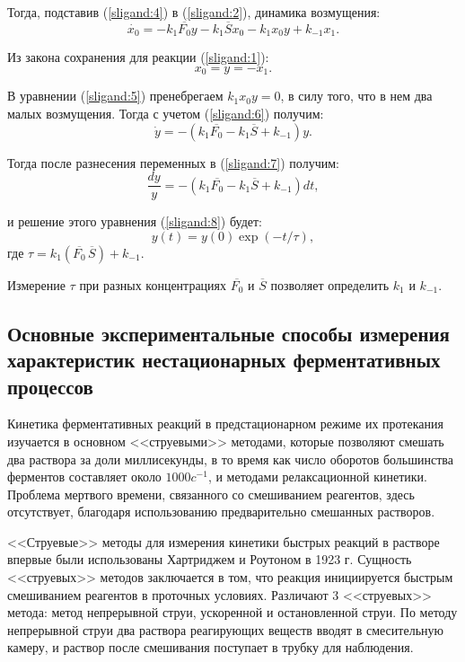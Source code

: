 \documentclass[12pt,a4paper,oneside]{book}
\begin{document}
Тогда, подставив (\ref{sligand:4}) в (\ref{sligand:2}), динамика возмущения:
\begin{equation}
	\label{sligand:5}
	\dot{x_0} = - k_1 \overline{F_0} y - k_1 \overline{S} x_0 - k_1 x_0 y + k_{-1} x_1.
\end{equation}

Из закона сохранения для реакции (\ref{sligand:1}):
\begin{equation}
	\label{sligand:6}
	x_0 = y = - x_1.
\end{equation}

В уравнении (\ref{sligand:5}) пренебрегаем $k_1 x_0 y = 0$, в силу того, что в нем два малых возмущения. Тогда с учетом (\ref{sligand:6}) получим:
\begin{equation}
	\label{sligand:7}
	\dot y = - (k_1 \overline{F_0} - k_1 \overline{S} + k_{-1} ) y.
\end{equation}

Тогда после разнесения переменных в (\ref{sligand:7}) получим:
\begin{equation}
	\label{sligand:8}
	\frac{dy}{y} = - (k_1 \overline{F_0} - k_1 \overline{S} + k_{-1} ) dt,
\end{equation}

и решение этого уравнения (\ref{sligand:8}) будет:
\begin{equation}
	\label{sligand:9}
	y(t) = y(0) \exp (-t / \tau ),
\end{equation}
где $\tau = k_1 (\overline{F_0} \, \overline{S}) + k_{-1}$.

Измерение $\tau$ при разных концентрациях $\overline{F_0}$ и $\overline{S}$ позволяет определить $k_1$ и $k_{-1}$.



\subsection{Основные экспериментальные способы измерения характеристик нестационарных ферментативных процессов}

Кинетика ферментативных реакций в предстационарном режиме их протекания изучается в основном <<струевыми>> методами, которые позволяют смешать два раствора за доли миллисекунды, в то время как число оборотов большинства ферментов составляет около $1000 c^{-1}$, и методами релаксационной кинетики. Проблема мертвого времени, связанного со смешиванием реагентов, здесь отсутствует, благодаря использованию предварительно смешанных растворов. 

<<Струевые>> методы для измерения кинетики быстрых реакций в растворе впервые были использованы Хартриджем и Роутоном в 1923 г. Сущность <<струевых>> методов заключается в том, что реакция инициируется быстрым смешиванием реагентов в проточных условиях. Различают 3 <<струевых>> метода: метод непрерывной струи, ускоренной и остановленной струи. По методу непрерывной струи два раствора реагирующих веществ вводят в смесительную камеру, и раствор после смешивания поступает в трубку для наблюдения.
\end{document}

